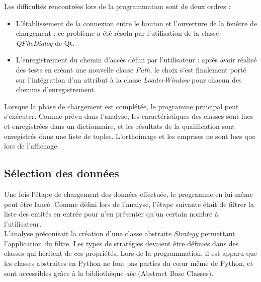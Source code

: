 \noindent Les difficultés rencontrées lors de la programmation sont de deux ordres :
\begin{itemize}[label=$\rightarrow$]
	\item L'établissement de la connexion entre le bouton et l'ouverture de la fenêtre de chargement : ce problème a été résolu par l'utilisation de la classe \textit{QFileDialog} de Qt. 
	\item L'enregistrement du chemin d'accès défini par l'utilisateur : après avoir réalisé des tests en créant une nouvelle classe \textit{Path}, le choix s'est finalement porté sur l'intégration d'un attribut à la classe \textit{LoaderWindow} pour chacun des chemins d'enregistrement.
\end{itemize}

Lorsque la phase de chargement est complétée, le programme principal peut s'exécuter. Comme prévu dans l'analyse, les caractéristiques des classes sont lues et enregistrées dans un dictionnaire, et les résultats de la qualification sont enregistrés dans une liste de tuples. L'orthoimage et les emprises ne sont lues que lors de l'affichage.

\subsection{Sélection des données}

Une fois l'étape de chargement des données effectuée, le programme en lui-même peut être lancé. Comme défini lors de l'analyse, l'étape suivante était de filtrer la liste des entités en entrée pour n'en présenter qu'un certain nombre à l'utilisateur. \\

L'analyse préconisait la création d'une classe abstraite \textit{Strategy} permettant l'application du filtre. Les types de stratégies devaient être définies dans des classes qui  héritent de ces propriétés. Lors de la programmation, il est apparu que les classes abstraites en Python ne font pas parties du cœur même de Python, et sont accessibles grâce à la bibliothèque \textit{abc} (Abstract Base Classes). \\

